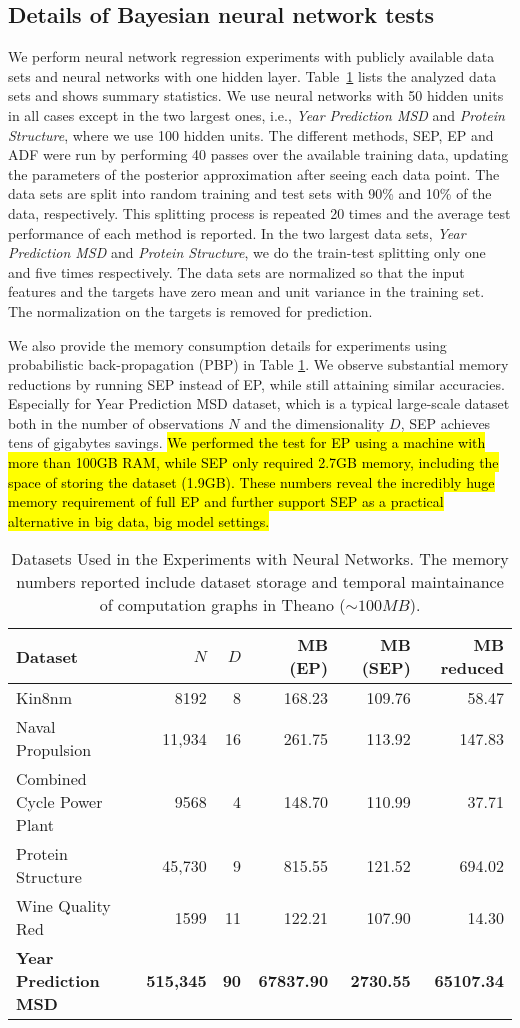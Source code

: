 \documentclass{article} %
\begin{document}
\subsection{Details of Bayesian neural network tests}

We perform neural network regression experiments with publicly available data sets and neural networks with one hidden layer.  Table~\ref{tab:datasets_neural_networks} lists the analyzed data sets and shows summary statistics.  We use neural networks with 50 hidden units in all cases except in the two largest ones, i.e., \emph{Year Prediction
MSD} and \emph{Protein Structure}, where we use 100 hidden units. The different methods, SEP, EP and ADF were run by performing 40 passes over the available training data, updating the parameters of the posterior approximation after seeing each data point.  The data sets are split into random training and test sets with 90\% and 10\% of the data, respectively. This splitting process is repeated 20 times and the average test performance of each method is reported. In the two largest data sets, \emph{Year Prediction MSD} and \emph{Protein Structure}, we do the train-test splitting only one and five times respectively. The data sets are normalized so that the input features and the targets have zero mean and unit variance in the training set. The normalization on the targets is removed for prediction.

We also provide the memory consumption details for experiments using probabilistic back-propagation (PBP) in Table \ref{tab:datasets_neural_networks}. We observe substantial memory reductions by running SEP instead of EP, while still attaining similar accuracies. Especially for Year Prediction MSD dataset, which is a typical large-scale dataset both in the number of observations $N$ and the dimensionality $D$, SEP achieves tens of gigabytes savings. \hl{We performed the test for EP using a machine with more than 100GB RAM, while SEP only required 2.7GB memory, including the space of storing the dataset (1.9GB). These numbers reveal the incredibly huge memory requirement of full EP and further support SEP as a practical alternative in big data, big model settings.}


\begin{table} 
\caption{Datasets Used in the Experiments with Neural Networks. The memory numbers reported include dataset storage and temporal maintainance of computation graphs in Theano ($\sim100MB$).}
\label{tab:datasets_neural_networks} 
\centering 
\begin{tabular}{lrrrrr} 
\hline  
\textbf{Dataset} & $N$ & $D$ & MB (EP) & MB (SEP) & MB reduced \tabularnewline 
\hline 
Kin8nm & 8192 & 8 & 168.23 & 109.76 & 58.47 \tabularnewline 
Naval Propulsion & 11,934 & 16 & 261.75 & 113.92 & 147.83 \tabularnewline 
Combined Cycle Power Plant & 9568 & 4 & 148.70 & 110.99 & 37.71 \tabularnewline 
Protein Structure & 45,730 & 9 & 815.55 & 121.52 & 694.02 \tabularnewline 
Wine Quality Red & 1599 & 11 & 122.21 & 107.90 & 14.30 \tabularnewline 
\bf{Year Prediction MSD} & \bf{515,345} & \bf{90} & \bf{67837.90} & \bf{2730.55} & \bf{65107.34} \tabularnewline 
\hline 
\end{tabular}
\end{table}
\end{document}
